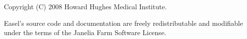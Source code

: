 \vspace*{\fill}
\begin{flushleft}
Copyright (C) 2008 Howard Hughes Medical Institute.

\vspace{2em} 

Easel's source code and documentation are freely redistributable and
modifiable under the terms of the Janelia Farm Software License.
\end{flushleft}








